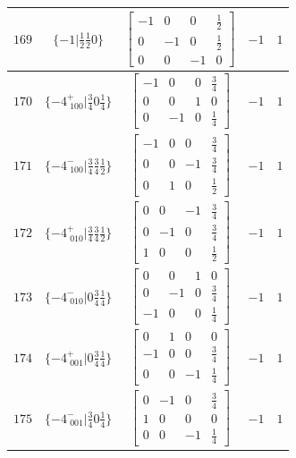 \documentclass[fleqn,8pt]{jsarticle}
\begin{document}
\begin{longtable}{ccccc}
$ 169 $ & $ \{-1|\frac{1}{2} \frac{1}{2} 0\} $ & $ \begin{bmatrix} -1 & 0 & 0 & \frac{1}{2} \\ 0 & -1 & 0 & \frac{1}{2} \\ 0 & 0 & -1 & 0 \end{bmatrix} $ & $ -1 $ & $ 1 $ \\ \hline
$ 170 $ & $ \{-4^{+}_{\,\,100}|\frac{3}{4} 0 \frac{1}{4}\} $ & $ \begin{bmatrix} -1 & 0 & 0 & \frac{3}{4} \\ 0 & 0 & 1 & 0 \\ 0 & -1 & 0 & \frac{1}{4} \end{bmatrix} $ & $ -1 $ & $ 1 $ \\ \hline
$ 171 $ & $ \{-4^{-}_{\,\,100}|\frac{3}{4} \frac{3}{4} \frac{1}{2}\} $ & $ \begin{bmatrix} -1 & 0 & 0 & \frac{3}{4} \\ 0 & 0 & -1 & \frac{3}{4} \\ 0 & 1 & 0 & \frac{1}{2} \end{bmatrix} $ & $ -1 $ & $ 1 $ \\ \hline
$ 172 $ & $ \{-4^{+}_{\,\,010}|\frac{3}{4} \frac{3}{4} \frac{1}{2}\} $ & $ \begin{bmatrix} 0 & 0 & -1 & \frac{3}{4} \\ 0 & -1 & 0 & \frac{3}{4} \\ 1 & 0 & 0 & \frac{1}{2} \end{bmatrix} $ & $ -1 $ & $ 1 $ \\ \hline
$ 173 $ & $ \{-4^{-}_{\,\,010}|0 \frac{3}{4} \frac{1}{4}\} $ & $ \begin{bmatrix} 0 & 0 & 1 & 0 \\ 0 & -1 & 0 & \frac{3}{4} \\ -1 & 0 & 0 & \frac{1}{4} \end{bmatrix} $ & $ -1 $ & $ 1 $ \\ \hline
$ 174 $ & $ \{-4^{+}_{\,\,001}|0 \frac{3}{4} \frac{1}{4}\} $ & $ \begin{bmatrix} 0 & 1 & 0 & 0 \\ -1 & 0 & 0 & \frac{3}{4} \\ 0 & 0 & -1 & \frac{1}{4} \end{bmatrix} $ & $ -1 $ & $ 1 $ \\ \hline
$ 175 $ & $ \{-4^{-}_{\,\,001}|\frac{3}{4} 0 \frac{1}{4}\} $ & $ \begin{bmatrix} 0 & -1 & 0 & \frac{3}{4} \\ 1 & 0 & 0 & 0 \\ 0 & 0 & -1 & \frac{1}{4} \end{bmatrix} $ & $ -1 $ & $ 1 $ \\ \hline

\end{longtable}
\end{document}
